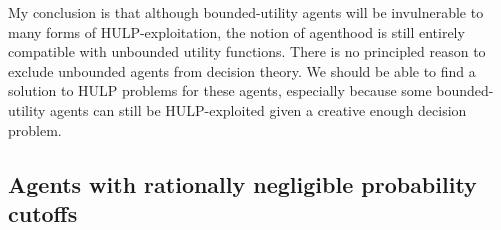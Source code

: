 \documentclass{article}
\begin{document}
My conclusion is that although bounded-utility agents will be invulnerable to many forms of HULP-exploitation, the notion of agenthood is still entirely compatible with unbounded utility functions. There is no principled reason to exclude unbounded agents from decision theory. We should be able to find a solution to HULP problems for these agents, especially because some bounded-utility agents can still be HULP-exploited given a creative enough decision problem.

\subsection{Agents with rationally negligible probability cutoffs}



\end{document}

